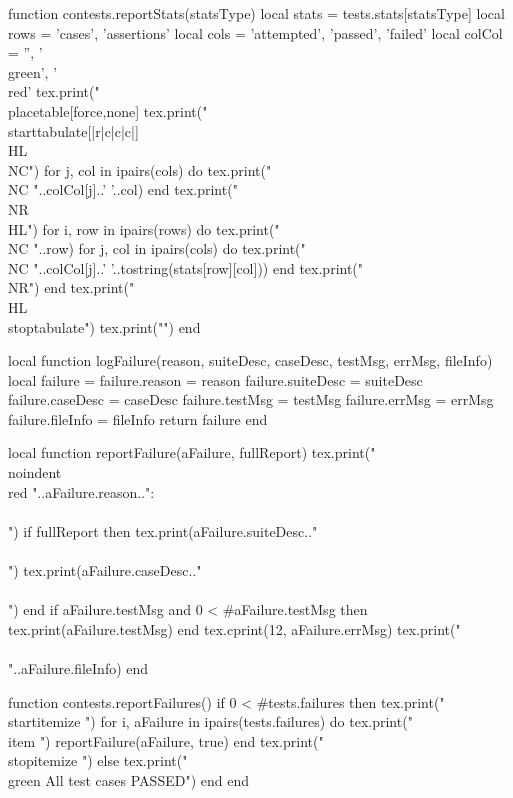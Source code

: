 function contests.reportStats(statsType)
  local stats = tests.stats[statsType]
  local rows = { 'cases', 'assertions' }
  local cols =
    { 'attempted', 'passed', 'failed' }
  local colCol = { '', '\\green', '\\red' }
  tex.print("\\placetable[force,none]{}{%
  tex.print("\\starttabulate[|r|c|c|c|]\\HL\\NC")
  for j, col in ipairs(cols) do
    tex.print("\\NC "..colCol[j]..' '..col)
  end
  tex.print("\\NR\\HL")
  for i, row in ipairs(rows) do
    tex.print("\\NC "..row)
    for j, col in ipairs(cols) do
      tex.print("\\NC "..colCol[j]..' '..tostring(stats[row][col]))
    end
    tex.print("\\NR")
  end
  tex.print("\\HL\\stoptabulate")
  tex.print("}")
end

local function logFailure(reason, suiteDesc, caseDesc,
                          testMsg, errMsg, fileInfo)
  local failure = {}
  failure.reason    = reason
  failure.suiteDesc = suiteDesc
  failure.caseDesc  = caseDesc
  failure.testMsg   = testMsg
  failure.errMsg    = errMsg
  failure.fileInfo  = fileInfo
  return failure
end

local function reportFailure(aFailure, fullReport)
  tex.print("\\noindent{\\red "..aFailure.reason.."}:\\\\")
  if fullReport then
    tex.print(aFailure.suiteDesc.."\\\\")
    tex.print(aFailure.caseDesc.."\\\\")
  end
  if aFailure.testMsg and 0 < #aFailure.testMsg then
    tex.print(aFailure.testMsg)
  end
  tex.cprint(12, aFailure.errMsg)
  tex.print("\\\\"..aFailure.fileInfo)
end

function contests.reportFailures()
  if 0 < #tests.failures then
    tex.print("\\startitemize ")
    for i, aFailure in ipairs(tests.failures) do
      tex.print("\\item ")
      reportFailure(aFailure, true)
    end
    tex.print("\\stopitemize ")
  else
    tex.print("{\\green All test cases PASSED}")
  end
end
\stopLuaCode

\stopchapter